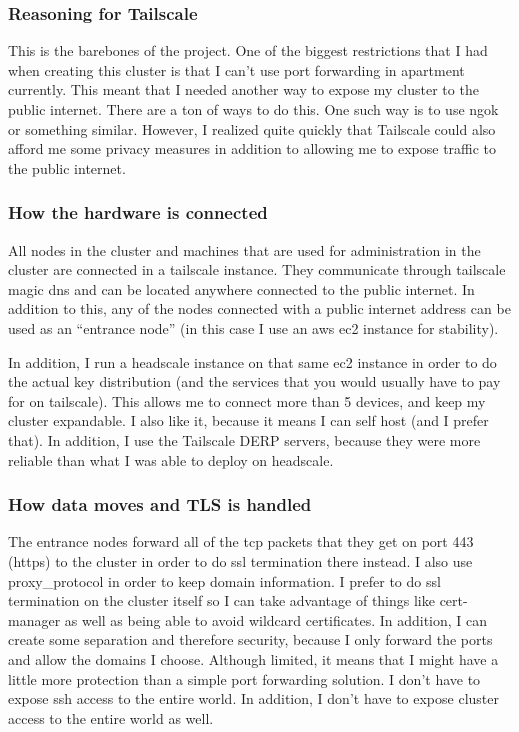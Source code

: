 \documentclass[12pt]{article}
\begin{document}
\subsubsection{Reasoning for Tailscale}
This is the barebones of the project. One of the biggest restrictions that I had when creating this cluster is that I can't use port forwarding in apartment currently. This meant that I needed another way to expose my cluster to the public internet. There are a ton of ways to do this. One such way is to use ngok or something similar. However, I realized quite quickly that Tailscale could also afford me some privacy measures in addition to allowing me to expose traffic to the public internet.

\subsubsection{How the hardware is connected}
All nodes in the cluster and machines that are used for administration in the cluster are connected in a tailscale instance. They communicate through tailscale magic dns and can be located anywhere connected to the public internet. In addition to this, any of the nodes connected with a public internet address can be used as an ``entrance node'' (in this case I use an aws ec2 instance for stability).

In addition, I run a headscale instance on that same ec2 instance in order to do the actual key distribution (and the services that you would usually have to pay for on tailscale). This allows me to connect more than 5 devices, and keep my cluster expandable. I also like it, because it means I can self host (and I prefer that). In addition, I use the Tailscale DERP servers, because they were more reliable than what I was able to deploy on headscale.

\subsubsection{How data moves and TLS is handled}
The entrance nodes forward all of the tcp packets that they get on port 443 (https) to the cluster in order to do ssl termination there instead. I also use proxy\_protocol in order to keep domain information. I prefer to do ssl termination on the cluster itself so I can take advantage of things like cert-manager as well as being able to avoid wildcard certificates. In addition, I can create some separation and therefore security, because I only forward the ports and allow the domains I choose. Although limited, it means that I might have a little more protection than a simple port forwarding solution. I don't have to expose ssh access to the entire world. In addition, I don't have to expose cluster access to the entire world as well.
\end{document}
